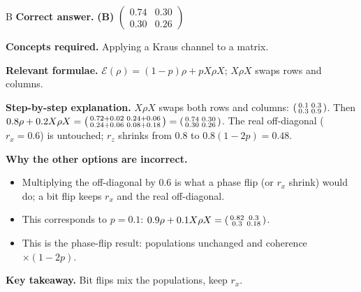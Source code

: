\documentclass[11pt,a4paper]{article}
\newcommand{\qsep}{\par\vspace{2pt}{\color{black!15}\hrule}\vspace{4pt}}
\begin{document}
\begin{solbox}{B}
\textbf{\color{brand}Correct answer.} \textcolor{okgreen}{\textbf{(B)}} $\begin{pmatrix}0.74 & 0.30\\ 0.30 & 0.26\end{pmatrix}$

\textbf{\color{brand}Concepts required.} Applying a Kraus channel to a matrix.

\textbf{\color{brand}Relevant formulae.} $\mathcal E(\rho) = (1-p)\rho + pX\rho X$; $X\rho X$ swaps rows and columns.

\textbf{\color{brand}Step-by-step explanation.} $X\rho X$ swaps both rows and columns: $\begin{psmallmatrix}0.1&0.3\\0.3&0.9\end{psmallmatrix}$. Then
$0.8\rho + 0.2X\rho X = \begin{psmallmatrix}0.72 + 0.02 & 0.24 + 0.06\\ 0.24 + 0.06 & 0.08 + 0.18\end{psmallmatrix} = \begin{psmallmatrix}0.74 & 0.30\\ 0.30 & 0.26\end{psmallmatrix}$.
The real off-diagonal ($r_x = 0.6$) is untouched; $r_z$ shrinks from $0.8$ to $0.8(1 - 2p) = 0.48$.

\textbf{\color{brand}Why the other options are incorrect.}
\begin{itemize}[leftmargin=2.4em, itemsep=1pt, topsep=2pt]
\item[\textbf{(A)}] Multiplying the off-diagonal by $0.6$ is what a phase flip (or $r_x$ shrink) would do; a bit flip keeps $r_x$ and the real off-diagonal.
\item[\textbf{(C)}] This corresponds to $p = 0.1$: $0.9\rho + 0.1X\rho X = \begin{psmallmatrix}0.82&0.3\\0.3&0.18\end{psmallmatrix}$.
\item[\textbf{(D)}] This is the phase-flip result: populations unchanged and coherence $\times(1 - 2p)$.
\end{itemize}
\textbf{\color{brand}Key takeaway.} Bit flips mix the populations, keep $r_x$.
\end{solbox}
\qsep
\end{document}
